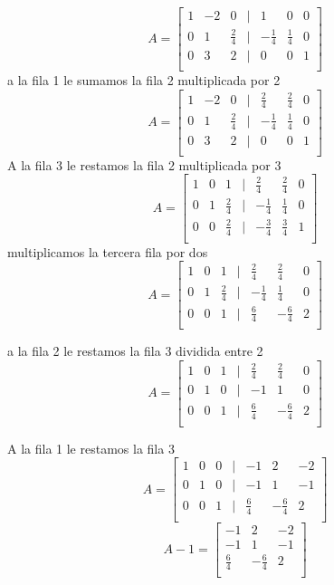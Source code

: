 \documentclass{article}
\begin{document}
\[
    A =
    \begin{bmatrix}
        1 & -2 & 0 & | & 1 & 0 & 0 \\
        0 & 1 & \frac{2}{4} & | & -\frac{1}{4} & \frac{1}{4} & 0 \\
        0 & 3 & 2 & | & 0 & 0 & 1 \\
    \end{bmatrix}
\]
a la fila 1 le sumamos la fila 2 multiplicada por 2
\[
    A =
    \begin{bmatrix}
        1 & -2 & 0 & | & \frac{2}{4} & \frac{2}{4} & 0 \\
        0 & 1 & \frac{2}{4} & | & -\frac{1}{4} & \frac{1}{4} & 0 \\
        0 & 3 & 2 & | & 0 & 0 & 1 \\
    \end{bmatrix}
\]
A la fila 3 le restamos la fila 2 multiplicada por 3
\[
    A =
    \begin{bmatrix}
        1 & 0 & 1 & | & \frac{2}{4} & \frac{2}{4} & 0 \\
        0 & 1 & \frac{2}{4} & | & -\frac{1}{4} & \frac{1}{4} & 0 \\
        0 & 0 & \frac{2}{4} & | & -\frac{3}{4} & \frac{3}{4} & 1 \\
    \end{bmatrix}
\]
multiplicamos la tercera fila por dos
\[
    A =
    \begin{bmatrix}
        1 & 0 & 1 & | & \frac{2}{4} & \frac{2}{4} & 0 \\
        0 & 1 & \frac{2}{4} & | & -\frac{1}{4} & \frac{1}{4} & 0 \\
        0 & 0 & 1 & | & \frac{6}{4} & -\frac{6}{4} & 2 \\
    \end{bmatrix}
\]

a la fila 2 le restamos la fila 3 dividida entre 2
\[
    A =
    \begin{bmatrix}
        1 & 0 & 1 & | & \frac{2}{4} & \frac{2}{4} & 0 \\
        0 & 1 & 0 & | & -1 & 1 & 0 \\
        0 & 0 & 1 & | & \frac{6}{4} & -\frac{6}{4} & 2 \\
    \end{bmatrix}
\]

A la fila 1 le restamos la fila 3
\[
    A =
    \begin{bmatrix}
        1 & 0 & 0 & | & -1 & 2 & -2 \\
        0 & 1 & 0 & | & -1 & 1 & -1 \\
        0 & 0 & 1 & | & \frac{6}{4} & -\frac{6}{4} & 2 \\
    \end{bmatrix}
\]
\[
    A-1 =
    \begin{bmatrix}
        -1 & 2 & -2 \\
        -1 & 1 & -1 \\
        \frac{6}{4} & -\frac{6}{4} & 2 \\
    \end{bmatrix}
\]
\end{document}
